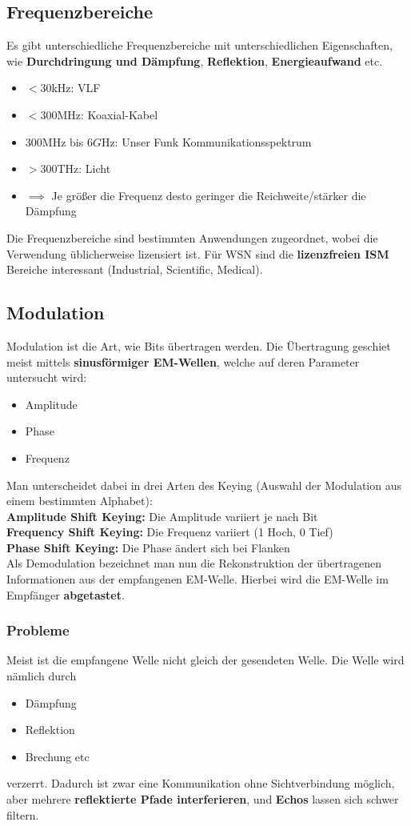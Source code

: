 \documentclass[a4paper]{article}
\begin{document}
\subsection{Frequenzbereiche}
Es gibt unterschiedliche Frequenzbereiche mit unterschiedlichen Eigenschaften, wie \textbf{Durchdringung und Dämpfung}, \textbf{Reflektion}, \textbf{Energieaufwand} etc.\\
\begin{itemize}
	\item $<30$kHz: VLF
	\item $<300$MHz: Koaxial-Kabel
	\item $300$MHz bis $6G$Hz: Unser Funk Kommunikationsspektrum
	\item $>300$THz: Licht
	\item$\implies$ Je größer die Frequenz desto geringer die Reichweite/stärker die Dämpfung
\end{itemize}
Die Frequenzbereiche sind bestimmten Anwendungen zugeordnet, wobei die Verwendung üblicherweise lizensiert ist. Für WSN sind die \textbf{lizenzfreien ISM} Bereiche interessant (Industrial, Scientific,  Medical).
\subsection{Modulation}
Modulation ist die Art, wie Bits übertragen werden. Die Übertragung geschiet meist mittels \textbf{sinusförmiger EM-Wellen}, welche auf deren Parameter untersucht wird:
\begin{itemize}
	\item Amplitude
	\item Phase
	\item Frequenz
\end{itemize}
Man unterscheidet dabei in drei Arten des Keying (Auswahl der Modulation aus einem bestimmten Alphabet):\\

\textbf{Amplitude Shift Keying:} Die Amplitude variiert je nach Bit\\
\textbf{Frequency Shift Keying:} Die Frequenz variiert (1 Hoch, 0 Tief)\\
\textbf{Phase Shift Keying:} Die Phase ändert sich bei Flanken\\

Als Demodulation bezeichnet man nun die Rekonstruktion der übertragenen Informationen aus der empfangenen EM-Welle. Hierbei wird die EM-Welle im Empfänger \textbf{abgetastet}.
\subsubsection{Probleme}
Meist ist die empfangene Welle nicht gleich der gesendeten Welle. Die Welle wird nämlich durch
\begin{itemize}
	\item Dämpfung
	\item Reflektion
	\item Brechung etc
\end{itemize}
verzerrt. Dadurch ist zwar eine Kommunikation ohne Sichtverbindung möglich, aber mehrere \textbf{reflektierte Pfade interferieren}, und \textbf{Echos} lassen sich schwer filtern.\\
\end{document}

